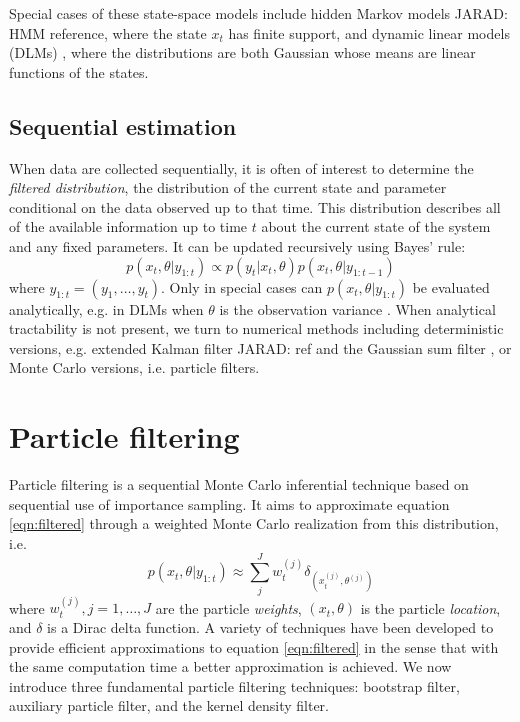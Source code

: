 \documentclass{elsarticle}
\newcommand{\jarad}[1]{{\color{red}JARAD: #1}}
\begin{document}
Special cases of these state-space models include hidden Markov models \jarad{HMM reference}, where the state $x_t$ has finite support, and dynamic linear models (DLMs) \citep{West:Harr:baye:1997}, where the distributions are both Gaussian whose means are linear functions of the states.

\subsection{Sequential estimation}

When data are collected sequentially, it is often of interest to determine the \emph{filtered distribution}, the distribution of the current state and parameter conditional on the data observed up to that time. This distribution describes all of the available information up to time $t$ about the current state of the system and any fixed parameters. It can be updated recursively using Bayes' rule:
\begin{equation}
p(x_t,\theta| y_{1:t}) \propto p(y_t|x_t,\theta)p(x_t,\theta|y_{1:t-1}) \label{eqn:filtered}
\end{equation}
where $y_{1:t} = (y_1,\ldots,y_t)$. Only in special cases can $p(x_t,\theta| y_{1:t})$ be evaluated analytically, e.g. in DLMs when $\theta$ is the observation variance \cite[Sec 4.3,][]{petris2009dynamic}. When analytical tractability is not present, we turn to numerical methods including deterministic versions, e.g. extended Kalman filter \jarad{ref} and the Gaussian sum filter \citep{Alsp:Sore:nonl:1972}, or Monte Carlo versions, i.e. particle filters.

\section{Particle filtering \label{sec:filtering}}

Particle filtering is a sequential Monte Carlo inferential technique based on sequential use of importance sampling. It aims to approximate equation \eqref{eqn:filtered} through a weighted Monte Carlo realization from this distribution, i.e.
\begin{equation}
p(x_t,\theta| y_{1:t}) \approx \sum_{j}^J w_t^{(j)} \delta_{(x_t^{(j)},\theta^{(j)})} \label{eqn:approx}
\end{equation}
where $w_t^{(j)},j=1,\ldots,J$ are the particle \emph{weights}, $(x_t,\theta)$ is the particle \emph{location}, and $\delta$ is a Dirac delta function. A variety of techniques have been developed to provide efficient approximations to equation \eqref{eqn:filtered} in the sense that with the same computation time a better approximation is achieved. We now introduce three fundamental particle filtering techniques: bootstrap filter, auxiliary particle filter, and the kernel density filter.
\end{document}

